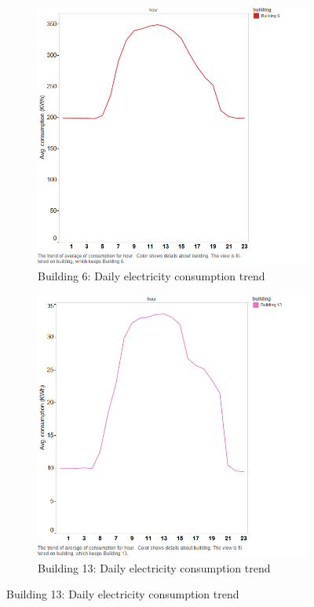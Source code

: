 \begin{figure}[h]
        \centering
        \begin{subfigure}[b]{0.45\textwidth}
                \includegraphics[width=\textwidth]{images/b6_daily_elec.png}
                \caption{Building 6: Daily electricity consumption trend}
                \label{fig:elec6}
        \end{subfigure}%
        \begin{subfigure}[b]{0.45\textwidth}
                \includegraphics[width=\textwidth]{images/b13_daily_elec.png}
                \caption{Building 13: Daily electricity consumption trend}
                \label{fig:elec13}
        \end{subfigure}
        

\end{figure}
